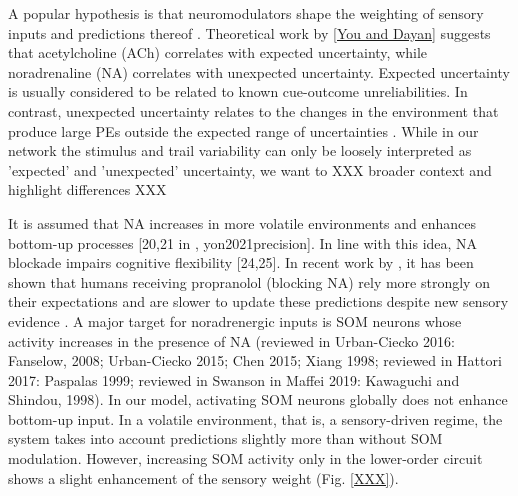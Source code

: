 \documentclass[10pt,a4paper,draft]{article}
\begin{document}

A popular hypothesis is that neuromodulators shape the weighting of sensory inputs and predictions thereof \citep{yon2021precision}. Theoretical work by \ref{You and Dayan} suggests that acetylcholine (ACh) correlates with expected uncertainty, while noradrenaline (NA) correlates with unexpected uncertainty. Expected uncertainty is usually considered to be related to known cue-outcome unreliabilities. In contrast, unexpected uncertainty relates to the changes in the environment that produce large PEs outside the expected range of uncertainties \citep{You and Dayan}. While in our network the stimulus and trail variability can only be loosely interpreted as 'expected' and 'unexpected' uncertainty, we want to XXX broader context and highlight differences XXX


It is assumed that NA increases in more volatile environments and enhances bottom-up processes [20,21 in \citep{lawson2021computational}, yon2021precision]. In line with this idea, NA blockade impairs cognitive flexibility [24,25\citep{lawson2021computational}]. In recent work by \citep{lawson2021computational}, it has been shown that humans receiving propranolol (blocking NA) rely more strongly on their expectations and are slower to update these predictions despite new sensory evidence \citep{yon2021precision}. A major target for noradrenergic inputs is SOM neurons whose activity increases in the presence of NA (reviewed in Urban-Ciecko 2016: Fanselow, 2008; Urban-Ciecko 2015; Chen 2015; Xiang 1998; reviewed in Hattori 2017: Paspalas 1999; reviewed in Swanson in Maffei 2019: Kawaguchi and Shindou, 1998). In our model, activating SOM neurons globally does not enhance bottom-up input. In a volatile environment, that is, a sensory-driven regime, the system takes into account predictions slightly more than without SOM modulation. However, increasing SOM activity only in the lower-order circuit shows a slight enhancement of the sensory weight (Fig. \ref{XXX}).
\end{document}
